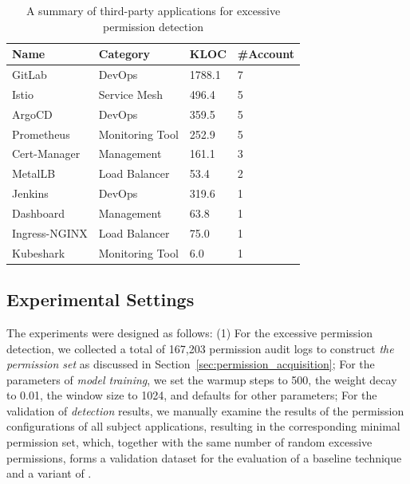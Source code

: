 \documentclass[conference]{IEEEtran}
\theoremstyle{definition}
\begin{document}
\begin{table}[!htb]
\centering
\caption{A summary of third-party applications for excessive permission detection}
\begin{tabular}{llll}
\hline
\textbf{Name} & \textbf{Category} &\textbf{KLOC} &\textbf{\#Account}\\
\hline
GitLab & DevOps  & 1788.1& 7\\
Istio & Service Mesh & 496.4 & 5 \\ 
ArgoCD & DevOps & 359.5 & 5\\ 
Prometheus & Monitoring Tool& 252.9 & 5 \\ 
Cert-Manager & Management&  161.1 & 3\\ 
MetalLB & Load Balancer & 53.4 & 2  \\ 
Jenkins & DevOps&  319.6 & 1\\ 
Dashboard &  Management &  63.8 & 1 \\
Ingress-NGINX & Load Balancer & 75.0 & 1 \\ 
Kubeshark & Monitoring Tool & 6.0 & 1 \\
\hline 
\end{tabular}
\label{tab:3rd-app}
\end{table}
\vspace{-6pt}

\subsection{Experimental Settings} 
The experiments were designed as follows:
(1) For the excessive permission detection, we collected a total of 167,203 permission audit logs to construct \textit{the permission set} as discussed in Section~\ref{sec:permission_acquisition}; For the parameters of \textit{model training}, we set the warmup steps to 500, the weight decay to 0.01, the window size to 1024, and defaults for other parameters; For the validation of \textit{detection} results, we manually examine the results of the permission configurations of all subject applications, resulting in the corresponding minimal permission set, which, together with the same number of random excessive permissions, forms a validation dataset for the evaluation of a baseline technique and a variant of \kg.
\end{document}
